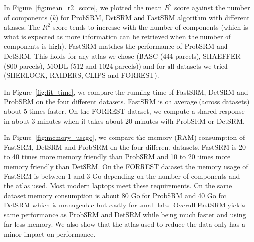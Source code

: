 \documentclass{report}
\begin{document}
{In Figure~\ref{fig:mean_r2_score}, we plotted the mean $R^2$ score against the number of components ($k$) for ProbSRM, DetSRM and FastSRM algorithm with different atlases.
%
The $R^2$ score tends to increase with the number of components (which is what is expected as more information can be retrieved when the number of components is high).
%
FastSRM matches the performance of ProbSRM and DetSRM. This holds for any atlas we chose (BASC (444 parcels), SHAEFFER (800 parcels), MODL (512 and 1024 parcels)) and for all datasets we tried (SHERLOCK, RAIDERS, CLIPS and FORREST). 

In Figure~\ref{fig:fit_time}, we compare the running time of FastSRM, DetSRM and ProbSRM on the four different datasets.
%
FastSRM is on average (across datasets) about 5 times faster.
%
On the FORREST dataset, we compute a shared response in about 3 minutes when it takes about 20 minutes with ProbSRM or DetSRM.

In Figure~\ref{fig:memory_usage}, we compare the memory (RAM) consumption of FastSRM, DetSRM and ProbSRM on the four different datasets.
%
FastSRM is 20 to 40 times more memory friendly than ProbSRM and 10 to 20 times more memory friendly than DetSRM. On the FORREST dataset the memory usage of FastSRM is between 1 and 3 Go depending on the number of components and the atlas used. Most modern laptops meet these requirements. On the same dataset memory consumption is about 80 Go for ProbSRM and 40 Go for DetSRM which is manageable but costly for small labs.
%
Overall FastSRM yields same performance as ProbSRM and DetSRM while being much faster and using far less memory. We also show that the atlas used to reduce the data only has a minor impact on performance.

}
\end{document}
